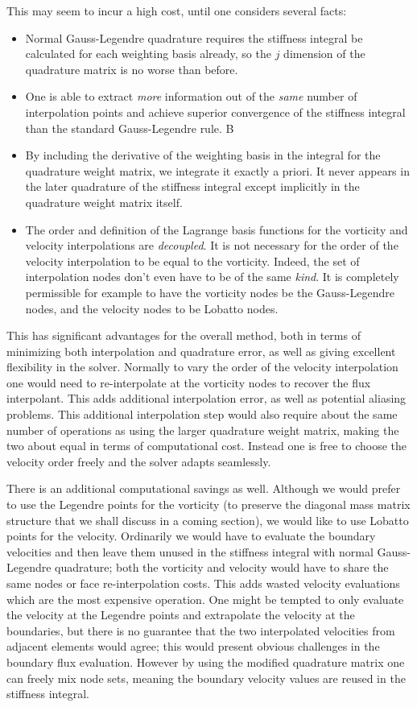 \documentclass[letterpaper,12pt]{report}
\begin{document}
This may seem to incur a high cost, until one considers several facts:
\begin{itemize}
\item Normal Gauss-Legendre quadrature requires the stiffness integral be calculated for each weighting basis already, so the $j$ dimension of the quadrature matrix is no worse than before. 
\item One is able to extract \textit{more} information out of the \textit{same} number of interpolation points and achieve superior convergence of the stiffness integral than the standard Gauss-Legendre rule. B
\item By including the derivative of the weighting basis in the integral for the quadrature weight matrix, we integrate it exactly a priori. It never appears in the later quadrature of the stiffness integral except implicitly in the quadrature weight matrix itself.
\item The order and definition of the Lagrange basis functions for the vorticity and velocity interpolations are \textit{decoupled}. It is not necessary for the order of the velocity interpolation to be equal to the vorticity. Indeed, the set of interpolation nodes don't even have to be of the same \textit{kind}. It is completely permissible for example to have the vorticity nodes be the Gauss-Legendre nodes, and the velocity nodes to be Lobatto nodes.
\end{itemize}

This has significant advantages for the overall method, both in terms of minimizing both interpolation and quadrature error, as well as giving excellent flexibility in the solver. Normally to vary the order of the velocity interpolation one would need to re-interpolate at the vorticity nodes to recover the flux interpolant. This adds additional interpolation error, as well as potential aliasing problems. This additional interpolation step would also require about the same number of operations as using the larger quadrature weight matrix, making the two about equal in terms of computational cost. Instead one is free to choose the velocity order freely and the solver adapts seamlessly.

There is an additional computational savings as well. Although we would prefer to use the Legendre points for the vorticity (to preserve the diagonal mass matrix structure that we shall discuss in a coming section), we would like to use Lobatto points for the velocity. Ordinarily we would have to evaluate the boundary velocities and then leave them unused in the stiffness integral with normal Gauss-Legendre quadrature; both the vorticity and velocity would have to share the same  nodes or face re-interpolation costs. This adds wasted velocity evaluations which are the most expensive operation. One might be tempted to only evaluate the velocity at the Legendre points and extrapolate the velocity at the boundaries, but there is no guarantee that the two interpolated velocities from adjacent elements would agree; this would present obvious challenges in the boundary flux evaluation. However by using the modified quadrature matrix one can freely mix node sets, meaning the boundary velocity values are reused in the stiffness integral.
\end{document}
